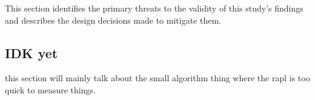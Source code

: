 This section identifies the primary threats to the validity of this study's findings and describes the design decisions made to mitigate them.

\subsection{IDK yet}
this section will mainly talk about the small algorithm thing where the rapl is too quick to measure things.


